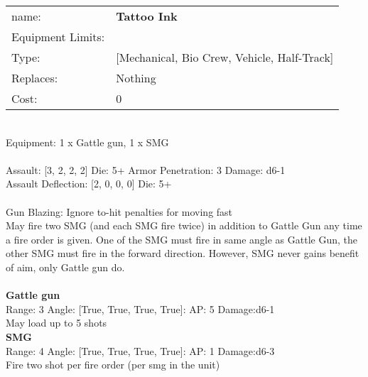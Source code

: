\noindent
\begin{tabular}{ll}
name: &{\bf Tattoo Ink } \\
Equipment Limits: & \\
Type: &[Mechanical, Bio Crew, Vehicle, Half-Track] \\
Replaces: &Nothing \\
Cost: & 0\\
\end{tabular}
\ \\
Equipment: 1 x Gattle gun, 1 x SMG \\
\ \\
Assault: [3, 2, 2, 2] Die: 5+ Armor Penetration: 3 Damage: d6-1 \\
Assault Deflection: [2, 0, 0, 0] Die: 5+\\
\indent  
\ \\
Gun Blazing: Ignore to-hit penalties for moving fast\\ 
May fire two SMG (and each SMG fire twice) in addition to Gattle Gun any time a fire order is given. One of the SMG must fire in same angle as Gattle Gun, the other SMG must fire in the forward direction. However, SMG never gains benefit of aim, only Gattle gun do.\\ 

\ \\
{\bf Gattle gun } \\



Range: 3  Angle: [True, True, True, True]: AP: 5 Damage:d6-1 \\
May load up to 5 shots\\ 




{\bf SMG } \\



Range: 4  Angle: [True, True, True, True]: AP: 1 Damage:d6-3 \\
Fire two shot per fire order (per smg in the unit)\\ 




 
\ \\



